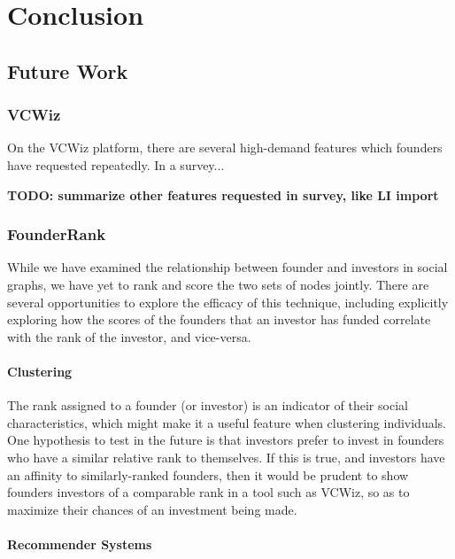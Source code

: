 \chapter{Conclusion}

\section{Future Work}

\subsection{VCWiz}

On the VCWiz platform, there are several high-demand features which founders have requested repeatedly. In a survey...

\textbf{TODO: summarize other features requested in survey, like LI import}


\subsection{FounderRank}

While we have examined the relationship between founder and investors in social graphs, we have yet to rank and score the two sets of nodes jointly. There are several opportunities to explore the efficacy of this technique, including explicitly exploring how the scores of the founders that an investor has funded correlate with the rank of the investor, and vice-versa.

\subsubsection{Clustering}

The rank assigned to a founder (or investor) is an indicator of their social characteristics, which might make it a useful feature when clustering individuals. One hypothesis to test in the future is that investors prefer to invest in founders who have a similar relative rank to themselves. If this is true, and investors have an affinity to similarly-ranked founders, then it would be prudent to show founders investors of a comparable rank in a tool such as VCWiz, so as to maximize their chances of an investment being made.

\subsubsection{Recommender Systems}

